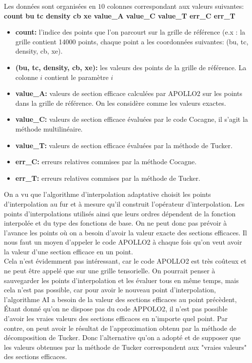 Les données sont organisées en $10$ colonnes correspondant aux valeurs suivantes: \textbf{count bu tc density cb xe value\_A value\_C value\_T err\_C err\_T}
\begin{itemize}
\item \textbf{count:} l'indice des points que l'on parcourt sur la grille de référence (e.x : la grille contient 14000 points, chaque point a les coordonnées suivantes: (bu, tc, density, cb, xe).
\item \textbf{(bu, tc, density, cb, xe):} les valeurs des points de la grille de référence. La colonne $i$ contient le paramètre $i$
\item \textbf{value\_A:} valeurs de section efficace calculées par APOLLO2 sur les points dans la grille de référence. On les considère comme les valeurs exactes.
\item \textbf{value\_C:} valeurs de section efficace évaluées par le code Cocagne, il s'agit la méthode multilinéaire.
\item \textbf{value\_T:} valeurs de section efficace évaluées par la méthode de Tucker.
\item \textbf{err\_C:} erreurs relatives commises par la méthode Cocagne.
\item \textbf{err\_T:} erreurs relatives commises par la méthode de Tucker.
\end{itemize}
\hspace{0.5cm}
On a vu que l'algorithme d'interpolation adaptative choisit les points d'interpolation au fur et à mesure qu'il construit l'opérateur d'interpolation. Les points d'interpolations utilisés ainsi que leurs ordres dépendent de la fonction interpolée et du type des fonctions de base. On ne peut donc pas prévoir à l'avance les points où on a besoin d'avoir la valeur exacte des sections efficaces. Il nous faut un moyen d'appeler le code APOLLO2 à chaque fois qu'on veut avoir la valeur d'une section efficace en un point.\\
\hspace{0.5cm}
Cela n'est évidemment pas intéressant, car le code APOLLO2 est très coûteux et ne peut être appelé que sur une grille tensorielle. On pourrait penser à sauvegarder les points d'interpolation et les évaluer tous en même temps, mais cela n'est pas possible, car pour avoir le nouveau point d'interpolation, l'algorithme AI a besoin de la valeur des sections efficaces au point précèdent, \\
\hspace{0.5cm} Étant donné qu'on ne dispose pas du code APPOLO2, il n'est pas possible d'avoir les vraies valeurs des sections efficaces en n'importe quel point. Par contre, on peut avoir le résultat de l'approximation obtenu par la méthode de décomposition de Tucker. Donc l'alternative qu'on a adopté et de supposer que les valeurs obtenues par la méthode de Tucker correspondent aux "vraies valeurs" des sections efficaces.\\
